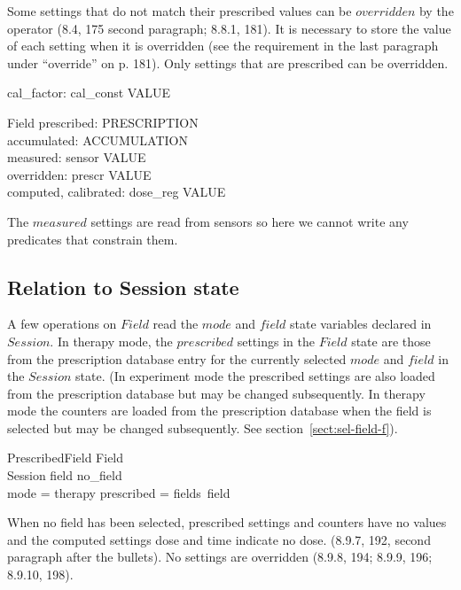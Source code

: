Some settings that do not match their prescribed values can be
$overridden$ by the operator (8.4, 175 second paragraph; 8.8.1, 181).
It is necessary to store the value of each setting when it is
overridden (see the requirement in the last paragraph under
``override'' on p.  181).  Only settings that are prescribed can be
overridden.

\begin{axdef}
	cal\_factor: cal\_const \fun VALUE
\end{axdef}

\begin{schema}{Field}
	prescribed: PRESCRIPTION \\
	accumulated: ACCUMULATION \\
	measured: sensor \fun VALUE \\
	overridden: prescr \pfun VALUE \\
	computed, calibrated: dose\_reg \fun VALUE \\
\end{schema}
The $measured$ settings are read from sensors so here we cannot write any
predicates that constrain them.

\subsection{Relation to Session state}

A few operations on $Field$ read the $mode$ and $field$ state variables
declared in $Session$.  In therapy mode, the $prescribed$ settings in
the $Field$ state are those from the prescription database entry for
the currently selected $mode$ and $field$ in the $Session$ state. (In
experiment mode the prescribed settings are also loaded from the
prescription database but may be changed subsequently.  In therapy
mode the counters are loaded from the prescription database when the
field is selected but may be changed subsequently.  See
section~\ref{sect:sel-field-f}).

\begin{schema}{PrescribedField}
	Field \\
	Session
\where
	field \neq no\_field \\
	mode = therapy \implies prescribed = fields~field \\
\end{schema}
When no field has been selected, prescribed settings and counters have
no values and the computed settings dose and time indicate no dose.
(8.9.7, 192, second paragraph after the bullets).  No settings are
overridden (8.9.8, 194; 8.9.9, 196; 8.9.10, 198).

